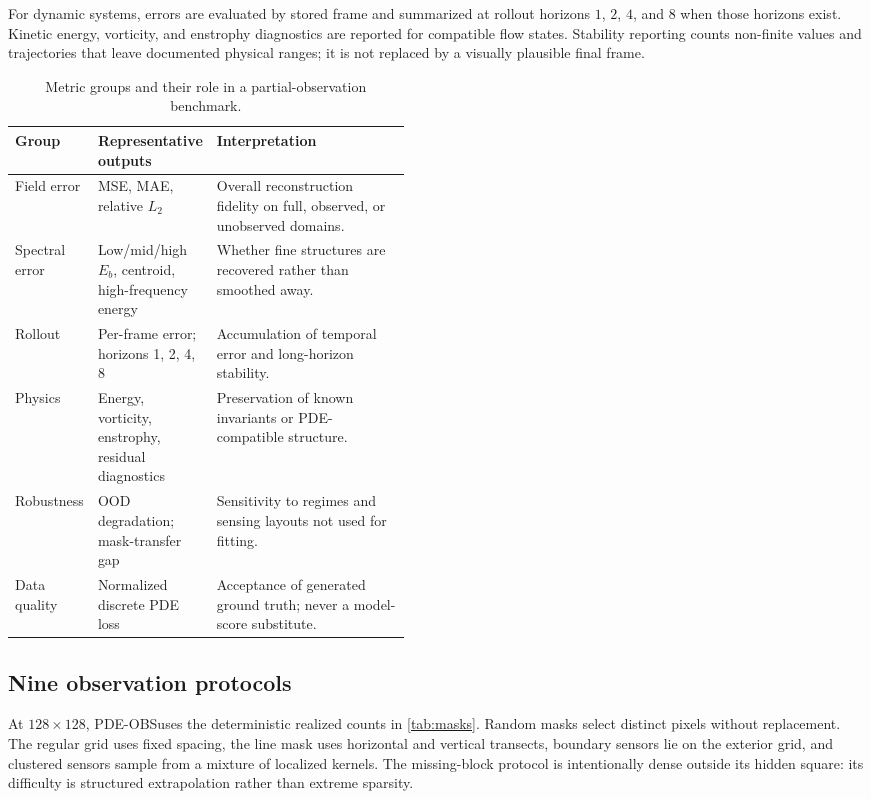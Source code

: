 \documentclass[10pt]{article}
\newcommand{\dataset}{\textsc{PDE-OBS}}
\begin{document}
For dynamic systems, errors are evaluated by stored frame and summarized at
rollout horizons $1$, $2$, $4$, and $8$ when those horizons exist.  Kinetic
energy, vorticity, and enstrophy diagnostics are reported for compatible flow
states.  Stability reporting counts non-finite values and trajectories that
leave documented physical ranges; it is not replaced by a visually plausible
final frame.

\begin{table}[t]
\centering
\caption{Metric groups and their role in a partial-observation benchmark.}
\label{tab:metrics}
\small
\begin{tabularx}{\linewidth}{@{}p{0.18\linewidth}p{0.28\linewidth}Y@{}}
\toprule
Group & Representative outputs & Interpretation \\
\midrule
Field error & MSE, MAE, relative $L_2$ & Overall reconstruction fidelity on full, observed, or unobserved domains. \\
Spectral error & Low/mid/high $E_b$, centroid, high-frequency energy & Whether fine structures are recovered rather than smoothed away. \\
Rollout & Per-frame error; horizons 1, 2, 4, 8 & Accumulation of temporal error and long-horizon stability. \\
Physics & Energy, vorticity, enstrophy, residual diagnostics & Preservation of known invariants or PDE-compatible structure. \\
Robustness & OOD degradation; mask-transfer gap & Sensitivity to regimes and sensing layouts not used for fitting. \\
Data quality & Normalized discrete PDE loss & Acceptance of generated ground truth; never a model-score substitute. \\
\bottomrule
\end{tabularx}
\end{table}

\subsection{Nine observation protocols}

At $128\times128$, \dataset uses the deterministic realized counts in
\cref{tab:masks}.  Random masks select distinct pixels without replacement.
The regular grid uses fixed spacing, the line mask uses horizontal and
vertical transects, boundary sensors lie on the exterior grid, and clustered
sensors sample from a mixture of localized kernels.  The missing-block
protocol is intentionally dense outside its hidden square: its difficulty is
structured extrapolation rather than extreme sparsity.
\end{document}
